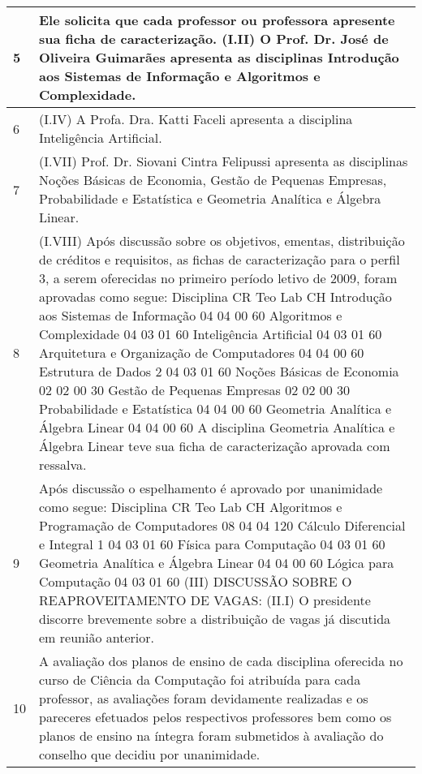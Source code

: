 \begin{longtable}{|p{0.2cm}|p{17cm}|}
 \\ \hline 
5 &
Ele solicita que cada professor ou professora apresente sua ficha de caracterização. 
(I.II) O Prof. Dr. José de Oliveira Guimarães apresenta as disciplinas Introdução aos Sistemas de Informação e Algoritmos e Complexidade.
 \\ \hline 
6 &
(I.IV) A Profa. Dra. Katti Faceli apresenta a disciplina Inteligência Artificial.
 \\ \hline 
7 &
(I.VII) Prof. Dr. Siovani Cintra Felipussi apresenta as disciplinas Noções Básicas de Economia, Gestão de Pequenas Empresas, Probabilidade e Estatística e Geometria Analítica e Álgebra Linear.
 \\ \hline 
8 &
(I.VIII) Após discussão sobre os objetivos, ementas, distribuição de créditos e requisitos, as fichas de caracterização para o perfil 3, a serem oferecidas no primeiro período letivo de 2009, foram aprovadas como segue: Disciplina CR Teo Lab CH Introdução aos Sistemas de Informação 04 04 00 60 Algoritmos e Complexidade 04 03 01 60 Inteligência Artificial 04 03 01 60 Arquitetura e Organização de Computadores 04 04 00 60 Estrutura de Dados 2 04 03 01 60 Noções Básicas de Economia 02 02 00 30 Gestão de Pequenas Empresas 02 02 00 30 Probabilidade e Estatística 04 04 00 60 Geometria Analítica e Álgebra Linear 04 04 00 60 A disciplina Geometria Analítica e Álgebra Linear teve sua ficha de caracterização aprovada com ressalva.
 \\ \hline 
9 &
Após discussão o espelhamento é aprovado por unanimidade como segue: Disciplina CR Teo Lab CH Algoritmos e Programação de Computadores 08 04 04 120 Cálculo Diferencial e Integral 1 04 03 01 60 Física para Computação 04 03 01 60 Geometria Analítica e Álgebra Linear 04 04 00 60 Lógica para Computação 04 03 01 60 (III) DISCUSSÃO SOBRE O REAPROVEITAMENTO DE VAGAS: (II.I) O presidente discorre brevemente sobre a distribuição de vagas já discutida em reunião anterior.
 \\ \hline 
10 &
A avaliação dos planos de ensino de cada disciplina oferecida no curso de Ciência da Computação foi atribuída para cada professor, as avaliações foram devidamente realizadas e os pareceres efetuados pelos respectivos professores bem como os planos de ensino na íntegra foram submetidos à avaliação do conselho que decidiu por unanimidade.
 \\ \hline 

\end{longtable} 


